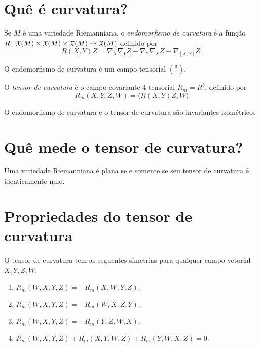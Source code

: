 \section{Quê é curvatura?}

\begin{definicao}
	Se $M$ é uma variedade Riemanniana, o \emph{endomorfismo de curvatura} é a função $R: \mathfrak{X}(M) \times \mathfrak{X}(M) \times \mathfrak{X}(M) \rightarrow \mathfrak{X}(M) $ definido por
	\begin{equation*}
		R(X,Y)Z = \nabla_X \nabla_Y Z - \nabla_Y \nabla_X Z - \nabla_{[X,Y]}Z.
	\end{equation*}
\end{definicao}

\begin{proposicao}
	O endomorfismo de curvatura é um campo tensorial $\binom{3}{1}$.
\end{proposicao}

\begin{definicao}
	O \emph{tensor de curvatura} é o campo covariante 4-tensorial $R_m = R^b$, definido por
	\begin{equation*}
		R_m (X,Y,Z,W) = \langle R(X,Y)Z,W \rangle
	\end{equation*}
\end{definicao}

\begin{lema}
	O endomorfismo de curvatura e o tensor de curvatura são invariantes isométricos
\end{lema}

\section{Quê mede o tensor de curvatura?}

\begin{teorema}
	Uma variedade Riemanniana é plana se e somente se seu tensor de curvatura é identicamente nulo.
\end{teorema}


\section{Propriedades do tensor de curvatura}

\begin{proposicao}
	O tensor de curvatura tem as seguentes simetrias para qualquer campo vetorial $X,Y,Z,W$:
	\begin{enumerate}
		\item $R_m(W,X,Y,Z) = -R_m(X,W,Y,Z)$.
		\item $R_m(W,X,Y,Z) = -R_m(W,X,Z,Y)$.
		\item $R_m(W,X,Y,Z) = -R_m(Y,Z,W,X)$.
		\item $R_m(W,X,Y,Z) + R_m(X,Y,W,Z) + R_m(Y,W,X,Z) = 0$.
	\end{enumerate}
\end{proposicao}


